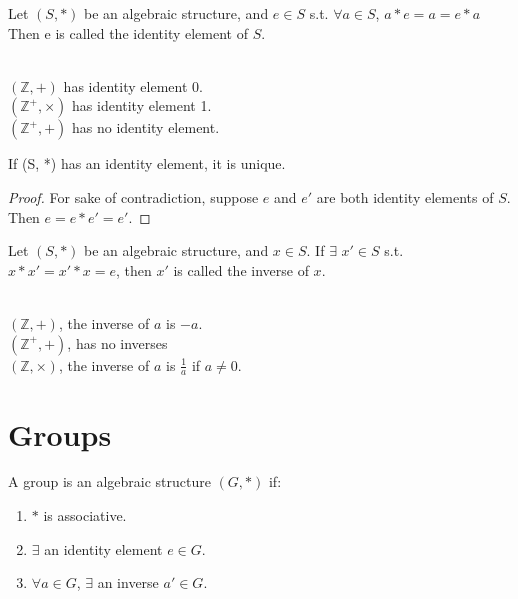 
\begin{definition}
    Let $(S, *)$ be an algebraic structure, and $e \in S$ s.t. $\forall a \in S$,  $a * e = a = e * a$ 
    Then e is called the identity element of $S$.
\end{definition}
\begin{eg}
    \vphantom{}\\
    \indent $(\mathbb{Z}, +)$ has identity element 0.\\
    \indent $(\mathbb{Z^+}, \times)$ has identity element 1.\\
    \indent $(\mathbb{Z^+}, +)$ has no identity element.
\end{eg}

\begin{theorem}\label{proof:unique_identity}
    If (S, *) has an identity element, it is unique.
\end{theorem}
\begin{proof}
    For sake of contradiction, suppose $e$ and $e'$ are both identity elements of $S$. Then $e = e * e' = e'$.
\end{proof}

\begin{definition}
    Let $(S, *)$ be an algebraic structure, and $x \in S$. If $\exists$ $x' \in S$ s.t. $x * x' = x' * x = e$, then $x'$ is called the inverse of $x$.
\end{definition}
\begin{eg}
    \vphantom{}\\
    \indent $(\mathbb{Z}, +)$, the inverse of $a$ is $-a$.\\
    \indent $(\mathbb{Z^+}, +)$, has no inverses\\
    \indent $(\mathbb{Z}, \times)$, the inverse of $a$ is $\frac{1}{a}$ if $a \neq 0$.
\end{eg}

\section{Groups}
\begin{definition}
    A group is an algebraic structure $(G, *)$ if:
    \begin{enumerate}
        \item $*$ is associative.
        \item $\exists$ an identity element $e \in G$.
        \item $\forall a \in G$, $\exists$ an inverse $a' \in G$.
    \end{enumerate}
\end{definition}

